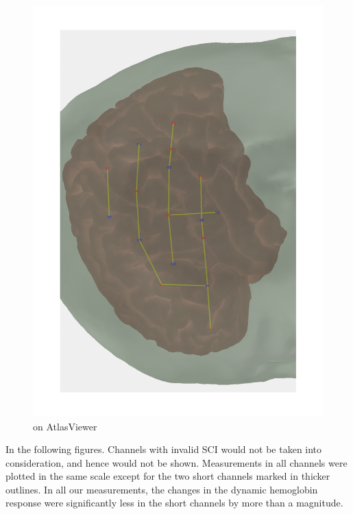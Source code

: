 \begin{figure}[H]
\begin{minipage}[c]{.22\linewidth}
  \includegraphics[scale= 0.2, angle = -90, origin= c] {pdf/atlas_optode_template}
  \caption{on AtlasViewer}
  \label{fig:test2}
\end{minipage}
\end{figure}

In the following figures. Channels with invalid SCI would not be taken into consideration, and hence would not be shown. Measurements in all channels were plotted in the same scale except for the two short channels marked in thicker outlines. In all our measurements, the changes in the dynamic hemoglobin response were significantly less in the short channels by more than a magnitude.

